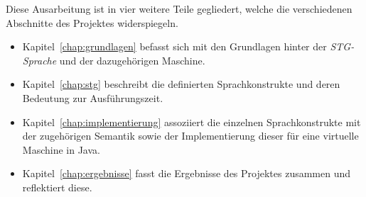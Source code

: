 Diese Ausarbeitung ist in vier weitere Teile gegliedert, welche die verschiedenen Abschnitte des Projektes widerspiegeln.

\begin{itemize}
\item Kapitel~\ref{chap:grundlagen} befasst sich mit den Grundlagen hinter der \textit{STG-Sprache} und der dazugehörigen Maschine.

\item Kapitel~\ref{chap:stg} beschreibt die definierten Sprachkonstrukte und deren Bedeutung zur Ausführungszeit.

\item Kapitel~\ref{chap:implementierung} assoziiert die einzelnen Sprachkonstrukte mit der zugehörigen Semantik sowie der Implementierung dieser für eine virtuelle Maschine in Java.

\item Kapitel~\ref{chap:ergebnisse} fasst die Ergebnisse des Projektes zusammen und reflektiert diese.

\end{itemize}


